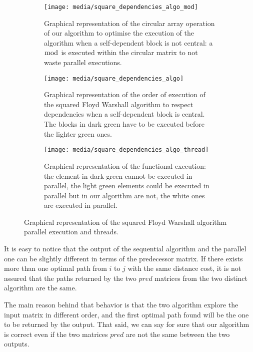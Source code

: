 \begin{figure}[htbp]
    \centering
    \begin{subfigure}[t]{0.3\textwidth}
        \texttt{[image: media/square\_dependencies\_algo\_mod]}
        
        \caption{Graphical representation of the circular array operation of our algorithm to optimise the execution of the algorithm when a self-dependent block is not central: a \(\bmod\) is executed within the circular matrix to not waste parallel executions.}
        \label{fig:square-dependecies-circular}
    \end{subfigure}
    \hfill
    \begin{subfigure}[t]{0.3\textwidth}
        \texttt{[image: media/square\_dependencies\_algo]}
        
        \caption{Graphical representation of the order of execution of the squared Floyd Warshall algorithm to respect dependencies when a self-dependent block is central. The blocks in dark green have to be executed before the lighter green ones.}
        \label{fig:square-dependecies-algo}
    \end{subfigure}
    \hfill
    \begin{subfigure}[t]{0.3\textwidth}
        \texttt{[image: media/square\_dependencies\_algo\_thread]}
        
        \caption{Graphical representation of the functional execution: the element in dark green cannot be executed in parallel, the light green elements could be executed in parallel but in our algorithm are not, the white ones are executed in parallel.}
        \label{fig:square-dependecies-thread}
    \end{subfigure}
    \caption{Graphical representation of the squared Floyd Warshall algorithm parallel execution and threads.}
    \label{fig:square-algo}
\end{figure}

It is easy to notice that the output of the sequential algorithm and the parallel one can be slightly different in terms of the predecessor matrix. If there exists more than one optimal path from \(i\) to \(j\) with the same distance cost, it is not assured that the paths returned by the two \(pred\) matrices from the two distinct algorithm are the same. 

The main reason behind that behavior is that the two algorithm explore the input matrix in different order, and the first optimal path found will be the one to be returned by the output. That said, we can say for sure that our algorithm is correct even if the two matrices \(pred\) are not the same between the two outputs.

\FloatBarrier
